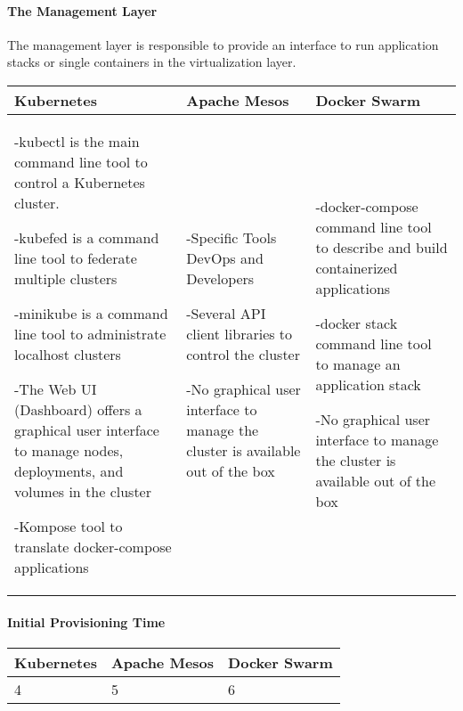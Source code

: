 \newpage
\paragraph{The Management Layer}

The management layer is responsible to provide an interface to run application
stacks or single containers in the virtualization layer.

\begin{center}
  \begin{tabular}{ | p{4.5cm} | p{4.5cm} | p{4.5cm} | }
  	\hline
    \textbf{Kubernetes}&\textbf{Apache Mesos}&\textbf{Docker Swarm}\\\hline
    -kubectl is the main command line tool to control a Kubernetes cluster.
    
    -kubefed is a command line tool to federate multiple clusters

	-minikube is a command line tool to administrate localhost clusters
    
    -The Web UI (Dashboard) offers a graphical user interface to manage nodes,
    deployments, and volumes in the cluster 
    
    -Kompose tool to translate docker-compose applications&
    
    -Specific Tools DevOps and Developers
    
    -Several API client libraries to control the cluster 
    
    -No graphical user interface to manage the cluster is available out of the
    box&
    
    -docker-compose command line tool to describe and build containerized
    applications
    
    -docker stack command line tool to manage an application stack 
    
    -No graphical user interface to manage the cluster is available out of the
    box\\
    
    \hline
  \end{tabular}
\end{center}

\paragraph{Initial Provisioning Time}

\begin{center}
  \begin{tabular}{ | p{4.5cm} | p{4.5cm} | p{4.5cm} | }
    \hline
    \textbf{Kubernetes}&\textbf{Apache Mesos}&\textbf{Docker Swarm}\\\hline
    4 & 5 & 6 \\
    \hline
  \end{tabular}
\end{center}

